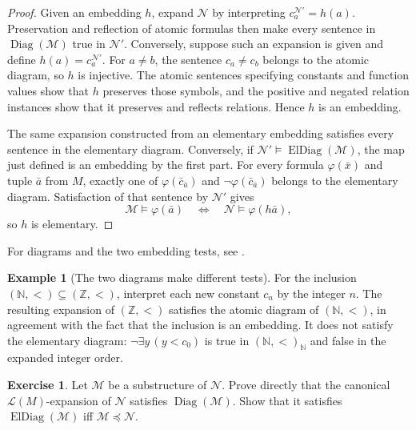 \documentclass[11pt,oneside,openany]{book}
\theoremstyle{definition}
\newtheorem{example}[definition]{Example}
\newtheorem{exercise}[definition]{Exercise}
\theoremstyle{plain}
\theoremstyle{remark}
\newcommand{\N}{\mathbb{N}}
\newcommand{\Z}{\mathbb{Z}}
\newcommand{\Lang}{\mathcal{L}}
\newcommand{\entails}{\models}
\begin{document}
\begin{proof}
Given an embedding \(h\), expand \(\mathcal N\) by interpreting
\(c_a^{\mathcal N'}=h(a)\).  Preservation and reflection of atomic formulas
then make every sentence in \(\operatorname{Diag}(\mathcal M)\) true in
\(\mathcal N'\).  Conversely, suppose such an expansion is given and define
\(h(a)=c_a^{\mathcal N'}\).  For \(a\ne b\), the sentence
\(c_a\ne c_b\) belongs to the atomic diagram, so \(h\) is injective.  The
atomic sentences specifying constants and function values show that \(h\)
preserves those symbols, and the positive and negated relation instances show
that it preserves and reflects relations.  Hence \(h\) is an embedding.

The same expansion constructed from an elementary embedding satisfies every
sentence in the elementary diagram.  Conversely, if
\(\mathcal N'\entails\operatorname{ElDiag}(\mathcal M)\), the map just
defined is an embedding by the first part.  For every formula
\(\varphi(\bar x)\) and tuple \(\bar a\) from \(M\), exactly one of
\(\varphi(\bar c_{\bar a})\) and
\(\neg\varphi(\bar c_{\bar a})\) belongs to the elementary diagram.
Satisfaction of that sentence by \(\mathcal N'\) gives
\[
  \mathcal M\entails\varphi(\bar a)
  \quad\Longleftrightarrow\quad
  \mathcal N\entails\varphi(h\bar a),
\]
so \(h\) is elementary.
\end{proof}

For diagrams and the two embedding tests, see
\cite{Hodges1993,Marker2002}.

\begin{example}[The two diagrams make different tests]
For the inclusion \((\N,<)\subseteq(\Z,<)\), interpret each new constant
\(c_n\) by the integer \(n\).  The resulting expansion of \((\Z,<)\)
satisfies the atomic diagram of \((\N,<)\), in agreement with the fact that
the inclusion is an embedding.  It does not satisfy the elementary diagram:
\(\neg\exists y\,(y<c_0)\) is true in \((\N,<)_{\N}\) and false in the
expanded integer order.
\end{example}

\begin{exercise}
\label{ex:maps-elementarity-01}
\label{ex:diagram-test}
Let \(\mathcal M\) be a substructure of \(\mathcal N\).  Prove directly that
the canonical \(\Lang(M)\)-expansion of \(\mathcal N\) satisfies
\(\operatorname{Diag}(\mathcal M)\).  Show that it satisfies
\(\operatorname{ElDiag}(\mathcal M)\) iff
\(\mathcal M\preccurlyeq\mathcal N\).
\end{exercise}
\end{document}
